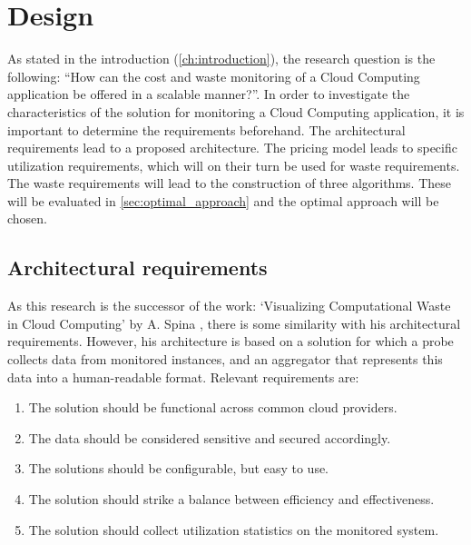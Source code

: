 \chapter{Design}\label{ch:design} %
As stated in the introduction (\autoref{ch:introduction}), the research question is the following: ``How can the cost and waste monitoring of a Cloud Computing application be offered in a scalable manner?''. In order to investigate the characteristics of the solution for monitoring a Cloud Computing application, it is important to determine the requirements beforehand. The architectural requirements lead to a proposed architecture. The pricing model leads to specific utilization requirements, which will on their turn be used for waste requirements. The waste requirements will lead to the construction of three algorithms. These will be evaluated in \autoref{sec:optimal_approach} and the optimal approach will be chosen.

\section{Architectural requirements} \label{sec:architectural_req}
As this research is the successor of the work: `Visualizing Computational Waste in Cloud Computing' by A. Spina \cite{spina}, there is some similarity with his architectural requirements. However, his architecture is based on a solution for which a probe collects data from monitored instances, and an aggregator that represents this data into a human-readable format. Relevant requirements are:
\begin{enumerate}
    \item The solution should be functional across common cloud providers.
    \item The data should be considered sensitive and secured accordingly.
    \item The solutions should be configurable, but easy to use.
    \item The solution should strike a balance between efficiency and effectiveness.
    \item The solution should collect utilization statistics on the monitored system. 
\end{enumerate}


